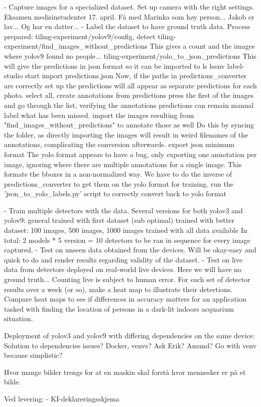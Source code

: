 - Capture images for a specialized dataset.
	Set up camera with the right settings.
	Eksamen medisinstudenter 17. april.
		Få med Marinka som høy person...
		Jakob er lav... Og har en datter...
- Label the dataset to have ground truth data.
	Process prepared: 
		tiling-experiment/yolov9/config, detect
		tiling-experiment/find_images_without_predictions
			This gives a count and the images where yolov9 found no people...
		tiling-experiment/yolo_to_json_predictions
			This will give the predictions in json format so it can be imported to ls
		lsenv
		label-studio start 
		import predictions.json
			Now, if the paths in predictions_converter are correctly set up the predictions will all appear as separate predictions for each photo.
		select all, create annotations from predictions
		press the first of the images and go through the list, verifying the annotations
			predictions can remain
		manual label what has been missed.
		import the images resulting from "find_images_without_predictions" to annotate those as well
			Do this by syncing the folder, as directly importing the images will result in weird filenames of the annotations, complicating the conversion afterwards.
		export json minimum format
			The yolo format appears to have a bug, only exporting one annotation per image, ignoring where there are multiple annotations for a single image.
			This formats the bboxes in a non-normalized way. We have to do the inverse of predictions_converter to get them on the yolo format for training.
		run the 'json_to_yolo_labels.py' script to correctly convert back to yolo format 

- Train multiple detectors with the data.
	Several versions for both yolov3 and yolov9:
		general
		trained with first dataset (sub optimal) 
		trained with better dataset:
			100 images, 500 images, 1000 images
		trained with all data available
	In total: 2 models * 5 version = 10 detectors to be ran in sequence for every image captured. 
- Test on unseen data obtained from the devices.
	Will be okay-easy and quick to do and render results regarding validity of the dataset. 
- Test on live data from detectors deployed on real-world live devices.
	Here we will have no ground truth... Counting live is subject to human error. 
	For each set of detector results over a week (or so), make a heat map to illustrate their detections. 
	Compare heat maps to see if differences in accuracy matters for an application tasked with finding the location of persons in a dark-lit indoors acquarium situation.

	Deployment of yolov3 and yolov9 with differing dependencies on the same device:
	Solution to dependencies issues? Docker, venvs?	Ask Erik? Amund? Go with venv because simplistic?

Hvor mange bilder trengs for at en maskin skal forstå hvor mennesker er på et bilde.



Ved levering:
- KI-deklareringsskjema